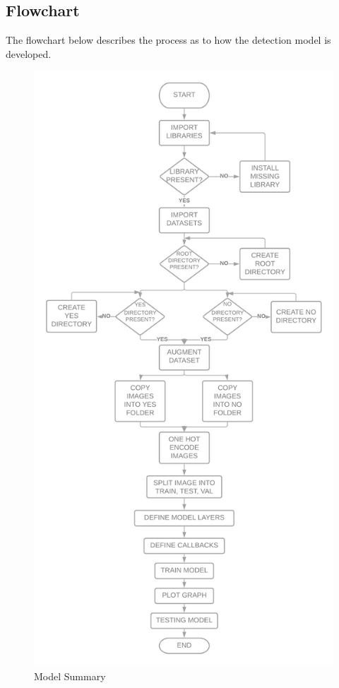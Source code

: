 \subsection{Flowchart}
The flowchart below describes the process as to how the detection model is developed.
\begin{figure}[H]
\includegraphics[scale=0.168]{Photos/model_flowchart.png}
\caption{Model Summary} \label{fig:model_flowchart}
\end{figure}
